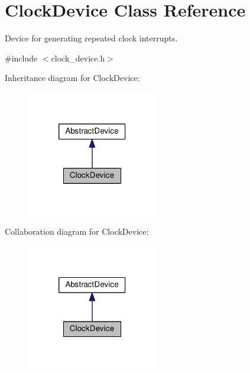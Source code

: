 \hypertarget{classClockDevice}{\section{\-Clock\-Device \-Class \-Reference}
\label{dc/d14/classClockDevice}
}


\-Device for generating repeated clock interrupts.  




{\ttfamily \#include $<$clock\-\_\-device.\-h$>$}



\-Inheritance diagram for \-Clock\-Device\-:\nopagebreak
\begin{figure}[H]
\begin{center}
\leavevmode
\includegraphics[width=162pt]{de/da0/classClockDevice__inherit__graph}
\end{center}
\end{figure}


\-Collaboration diagram for \-Clock\-Device\-:\nopagebreak
\begin{figure}[H]
\begin{center}
\leavevmode
\includegraphics[width=162pt]{d5/d1e/classClockDevice__coll__graph}
\end{center}
\end{figure}
